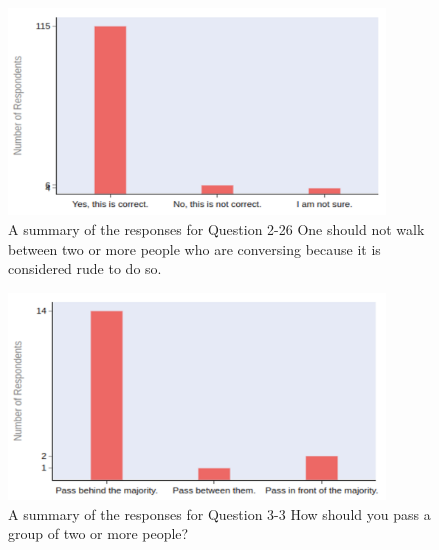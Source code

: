 \documentclass{CSSRforAfrica}
\begin{document}
\begin{figure}[tb]
\begin{center}
\includegraphics[width=100mm,angle=0]{consensus1.png}
\end{center}
\vspace{-5mm}
\caption{A summary of the responses for Question 2-26 One should not walk between two or more people who are conversing because it is considered rude to do so.}
\label{fig:consensus1}       
\end{figure}


\begin{figure}[tb]
\begin{center}
\includegraphics[width=100mm,angle=0]{consensus2.png}
\end{center}
\vspace{-5mm}
\caption{A summary of the responses for Question 3-3 How should you pass a group of two or more people?}
\label{fig:consensus2}       
\end{figure}
\end{document}
